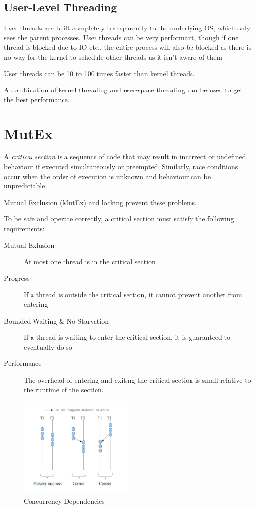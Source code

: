 \documentclass{article}
\begin{document}
\subsection{User-Level Threading}

User threads are built completely transparently to the underlying OS, which only sees the parent processes. User
threads can be very performant, though if one thread is blocked due to IO etc., the entire process will also be
blocked as there is no way for the kernel to schedule other threads as it isn't aware of them.

User threads can be 10 to 100 times faster than kernel threads.

A combination of kernel threading and user-space threading can be used to get the best performance.


\filbreak
\section{MutEx}\label{mutex}

A \emph{critical section} is a sequence of code that may result in
incorrect or undefined behaviour if executed simultaneously or
preempted. Similarly, race conditions occur when the order of execution
is unknown and behaviour can be unpredictable.

Mutual Exclusion (MutEx) and locking prevent these problems.

To be safe and operate correctly, a critical section must satisfy the
following requirements:

\begin{description}
\item[Mutual Exlusion]
At most one thread is in the critical section
\item[Progress]
If a thread is outside the critical section, it cannot prevent another
from entering
\item[Bounded Waiting \& No Starvation]
If a thread is waiting to enter the critical section, it is guaranteed
to eventually do so
\item[Performance]
The overhead of entering and exiting the critical section is small
relative to the runtime of the section.
\end{description}

\begin{figure}[h!]
  \centering
  \includegraphics[width=0.5\textwidth]{correctConcurrency}
  \caption{Concurrency Dependencies}
\end{figure}
\end{document}
